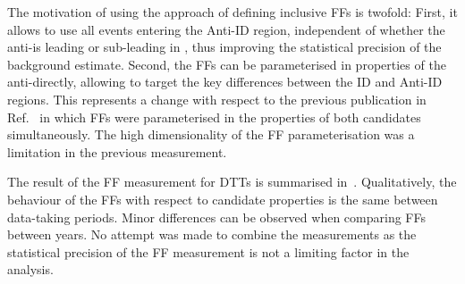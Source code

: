 {  %


  The motivation of using the approach of defining inclusive FFs is twofold:
  First, it allows to use all events entering the Anti-ID region, independent of
  whether the anti-\tauhadvis is leading or sub-leading in \pT, thus improving
  the statistical precision of the background estimate. Second, the FFs can be
  parameterised in properties of the anti-\tauhadvis directly, allowing to
  target the key differences between the ID and Anti-ID regions. This represents
  a change with respect to the previous publication in
  Ref.~\cite{HIGG-2016-16-witherratum} in which FFs were parameterised in the
  properties of both \tauhadvis candidates simultaneously. The high
  dimensionality of the FF parameterisation was a limitation in the previous
  measurement.}


The result of the FF measurement for DTTs is summarised
in~. Qualitatively, the behaviour of the FFs with
respect to \tauhadvis candidate properties is the same between data-taking
periods. Minor differences can be observed when comparing FFs between years. No
attempt was made to combine the measurements as the statistical precision of the
FF measurement is not a limiting factor in the analysis.

